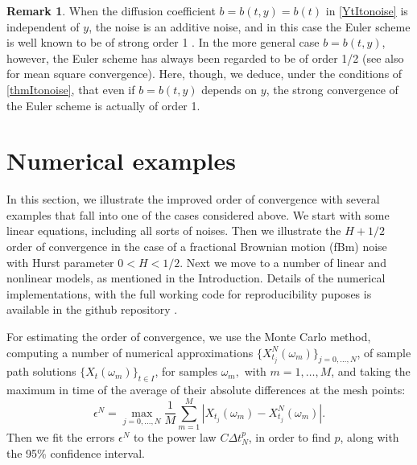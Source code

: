 \documentclass[reqno,12pt]{amsart}
\theoremstyle{plain} %
\theoremstyle{definition} %
\newtheorem{remark}{Remark}[section]
\begin{document}
\begin{remark}
    When the diffusion coefficient $b = b(t, y) = b(t)$ in \eqref{YtItonoise} is independent of $y$, the noise is an additive noise, and in this case the Euler scheme is well known to be of strong order 1 \cite[Section 19.3.1]{HighamKloeden2021}. In the more general case $b=b(t, y)$, however, the Euler scheme has always been regarded to be of order 1/2 \cite{GruneKloeden2001} (see also \cite{WangCaoHanKloeden2021} for mean square convergence). Here, though, we deduce, under the conditions of \cref{thmItonoise}, that even if $b=b(t, y)$ depends on $y$, the strong convergence of the Euler scheme is actually of order 1.    
\end{remark}

\section{Numerical examples}
\label{secnumericalexamples}

In this section, we illustrate the improved order of convergence with several examples that fall into one of the cases considered above. We start with some linear equations, including all sorts of noises. Then we illustrate the $H + 1/2$ order of convergence in the case of a fractional Brownian motion (fBm) noise with Hurst parameter $0 < H < 1/2$. Next we move to a number of linear and nonlinear models, as mentioned in the Introduction. Details of the numerical implementations, with the full working code for reproducibility puposes is available in the github repository \cite{RODEConvEM2023}.

For estimating the order of convergence, we use the Monte Carlo method, computing a number of numerical approximations $\{X_{t_j}^N(\omega_m)\}_{j=0, \ldots, N}$, of sample path solutions $\{X_t(\omega_m)\}_{t\in I}$, for samples $\omega_m,$ with $m = 1, \ldots, M$, and taking the maximum in time of the average of their absolute differences at the mesh points:
\begin{equation}
    \epsilon^N = \max_{j=0, \ldots, N} \frac{1}{M}\sum_{m=1}^M \left|X_{t_j}(\omega_m) - X_{t_j}^N(\omega_m)\right|.
\end{equation}
Then we fit the errors $\epsilon^N$ to the power law $C\Delta t_N^p$, in order to find $p$, along with the 95\% confidence interval.
\end{document}
